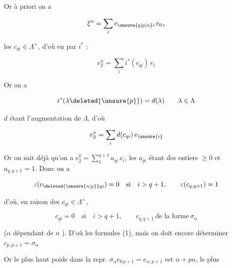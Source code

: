 
Or à priori on a

\[ \xi^{n}=\sum_i c_{\unsure{q|p|n}i}\,e_{0\,i} \]

les $c_{qi}\in\Lambda^+$, d'où en  par $i^*$ :

\[ e_2^n=\sum_i i^*(c_{qi})\,e_i \]


Or on a

\[ i^*(\lambda\deleted{\unsure{p}})=d(\lambda)\qquad\lambda\in\Lambda \]

$d$ étant l'augmentation de $\Lambda$, d'où

\[ e_2^n=\sum_i d(c_{qi})\,e_{\unsure{i}} \]

Or on sait déjà qu'on a $e_2^q=\sum_1^{q+1}a_{qi}\,e_i$, les $a_{qi}$ étant des entiers $\geq0$ et  $a_{q,q+1}=1$. Donc on a

\[ \varepsilon(c_{\deleted{\unsure{n|p}}qi})=0\quad\text{si}\quad i>q+1,\qquad \varepsilon(c_{q,q+1})=1 \]

d'où, en raison des $c_{qi}\in\Lambda^+$,

\[ c_{qi}=0\quad\text{si}\quad i>q+1,\qquad c_{q,q+1}\ \text{de la forme}\ \sigma_\alpha \]

($\alpha$ dépendant de $n$ ). D'où les formules (1), mais on doit encore déterminer \deleted{\unsure{$=$}}   $c_{p,p+1}=\sigma_\alpha$

Or le plus haut poids dans la repr. $\sigma_\alpha e_{0\,p+1}=e_{\alpha,p+1}$ est $\alpha+pn$,  le plus

